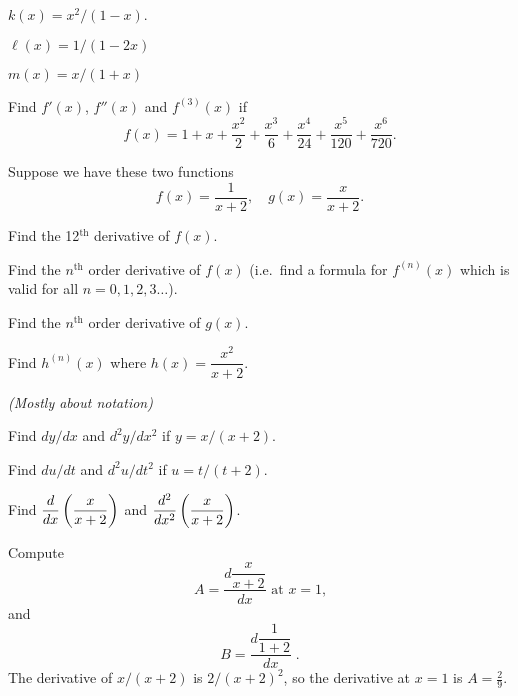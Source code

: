 \begin{multicols}{2}
\subprob $  k(x) = x^2/(1-x)$.




\subprob $  \ell(x) = 1/(1-2x)$




\subprob $  m(x) = x/(1+x)$








\problem 
Find $f'(x)$, $f''(x)$ and $f^{(3)}(x)$ if
\[
f(x)=1+x+\frac{x^2}{2}+\frac{x^3}{6}+\frac{x^4}{24}
+\frac{x^5}{120}+\frac{x^6}{720}.
\]








\problem \groupproblem  Suppose we have these two functions 
\[
f(x)=\frac{1} {x+2},\quad
g(x)=\frac{x} {x+2}.
\]




\subprob  Find the 12$^{\text{th}}$ derivative of $f(x)$.




\subprob  Find the $n^{\text{th}}$ order derivative of
$f(x)$  (i.e.\ find a formula for $f^{(n)}(x)$
which is valid for all $n=0, 1, 2, 3\ldots$).




\subprob  Find the $n^{\text{th}}$ order derivative of
$g(x)$.




\subprob Find $h^{(n)}(x)$ where $h(x) = \dfrac{x^2} {x+2}$.
















\problem \groupproblem \textit{(Mostly about notation)} 




\subprob  Find $dy/dx$ and $d^2y/dx^2$ if $y= x/( x+2)$.  




\subprob  Find $du/dt$ and $d^2u/dt^2$ if $u= t/(t+2)$.




\subprob  Find $\displaystyle \frac{d}{dx}\left(\frac x{x+2}\right)$ and
$\displaystyle\frac{d^2}{dx^2}\left(\frac x{x+2}\right)$.  




\subprob  Compute
\[
A= \frac{d\dfrac{x} {x+2}} {dx} \text{ at $x=1$,}
\]
and
\[
B= \frac{d\dfrac{1} {1+2}} {dx}\;.
\]
\answer 
The derivative of $x/(x+2)$ is $2/(x+2)^2$, so the derivative at $x=1$ is
$A = \frac29$.





\end{multicols}
